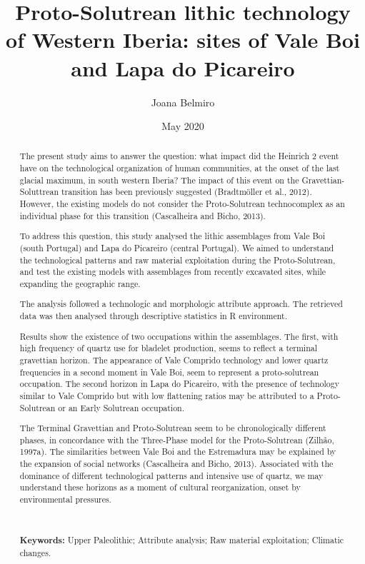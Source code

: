 \documentclass[12pt,twoside]{reedthesis}
\title{Proto-Solutrean lithic technology of Western Iberia: sites of Vale Boi and Lapa do Picareiro}
\author{Joana Belmiro}
\date{May 2020}
\begin{document}
  \maketitle

\frontmatter %


  \begin{abstract}
    The present study aims to answer the question: what impact did the Heinrich 2 event have on the technological organization of human communities, at the onset of the last glacial maximum, in south western Iberia? The impact of this event on the Gravettian-Soluttrean transition has been previously suggested (Bradtmöller et al., 2012). However, the existing models do not consider the Proto-Solutrean technocomplex as an individual phase for this transition (Cascalheira and Bicho, 2013).
    
    \par
    
    To address this question, this study analysed the lithic assemblages from Vale Boi (south Portugal) and Lapa do Picareiro (central Portugal). We aimed to understand the technological patterns and raw material exploitation during the Proto-Solutrean, and test the existing models with assemblages from recently excavated sites, while expanding the geographic range.
    
    The analysis followed a technologic and morphologic attribute approach. The retrieved data was then analysed through descriptive statistics in R environment.
    
    Results show the existence of two occupations within the assemblages. The first, with high frequency of quartz use for bladelet production, seems to reflect a terminal gravettian horizon. The appearance of Vale Comprido technology and lower quartz frequencies in a second moment in Vale Boi, seem to represent a proto-solutrean occupation. The second horizon in Lapa do Picareiro, with the presence of technology similar to Vale Comprido but with low flattening ratios may be attributed to a Proto-Solutrean or an Early Solutrean occupation.
    
    The Terminal Gravettian and Proto-Solutrean seem to be chronologically different phases, in concordance with the Three-Phase model for the Proto-Solutrean (Zilhão, 1997a). The similarities between Vale Boi and the Estremadura may be explained by the expansion of social networks (Cascalheira and Bicho, 2013). Associated with the dominance of different technological patterns and intensive use of quartz, we may understand these horizons as a moment of cultural reorganization, onset by environmental pressures.
    
    ~
    
    \textbf{Keywords:} Upper Paleolithic; Attribute analysis; Raw material exploitation; Climatic changes.
  \end{abstract}
\end{document}
